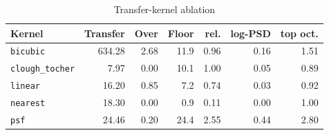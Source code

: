 \begin{table}[t]
\centering
\caption{Transfer-kernel ablation}
\label{tab:kernel_ablation}
\footnotesize
\begin{tabular}{@{}lrrrrrr@{}}
\toprule
Kernel & Transfer & Over & Floor & rel. & log-PSD & top oct. \\
\midrule
\texttt{bicubic} & 634.28 & 2.68 & 11.9 & 0.96 & 0.16 & 1.51 \\
\texttt{clough\_tocher} & 7.97 & 0.00 & 10.1 & 1.00 & 0.05 & 0.89 \\
\texttt{linear} & 16.20 & 0.85 & 7.2 & 0.74 & 0.03 & 0.92 \\
\texttt{nearest} & 18.30 & 0.00 & 0.9 & 0.11 & 0.00 & 1.00 \\
\texttt{psf} & 24.46 & 0.20 & 24.4 & 2.55 & 0.44 & 2.80 \\
\bottomrule
\end{tabular}

\end{table}
